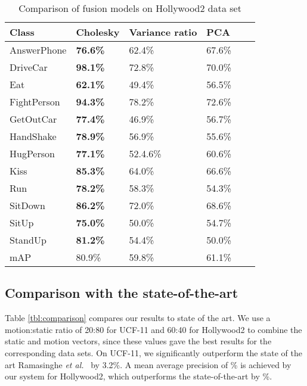 \begin{table}[]
\centering
\caption{Comparison of fusion models on Hollywood2 data set}\label{tbl:per-action fusionhollywood}
\begin{tabular}{|l||l|l|l|l|l|}
\hline
Class            & Cholesky & Variance ratio & PCA   \\ \hline  \hline
AnswerPhone      & \textbf{76.6\%}& 62.4\%    & 67.6\%           \\
DriveCar         & \textbf{98.1\%}& 72.8\%    & 70.0\%       \\
Eat              & \textbf{62.1\%}& 49.4\%    & 56.5\%          \\
FightPerson      & \textbf{94.3\%}& 78.2\%    & 72.6\%         \\
GetOutCar        & \textbf{77.4\%}& 46.9\%    & 56.7\%          \\
HandShake        & \textbf{78.9\%}         & 56.9\%    & 55.6\%            \\
HugPerson        & \textbf{77.1\%}& 52.4.6\%    & 60.6\%            \\
Kiss             &\textbf{85.3\%}         & 64.0\%    & 66.6\%           \\
Run              & \textbf{78.2\%}         & 58.3\%    & 54.3\%            \\
SitDown          & \textbf{86.2\%}         & 72.0\%    & 68.6\%            \\
SitUp            & \textbf{75.0\%}         & 50.0\%    & 54.7\%          \\
StandUp          & \textbf{81.2\%}         & 54.4\%    & 50.0\%          \\ \hline
mAP              &      80.9\%          &   59.8\%        &       61.1\%             \\ \hline
\end{tabular}
\end{table}


\subsection{Comparison with the state-of-the-art}

Table \ref{tbl:comparison} compares our results to state of the art. We use a motion:static ratio of 20:80 for UCF-11 and 60:40
for Hollywood2 to combine the static and motion vectors,
since these values gave the best results for the corresponding data sets. On UCF-11, we significantly outperform
the state of the art Ramasinghe \emph{et al.}~\cite{7486474} by 3.2\%. A mean average precision of \% is achieved by our system for Hollywood2, which outperforms
the state-of-the-art by \%.

